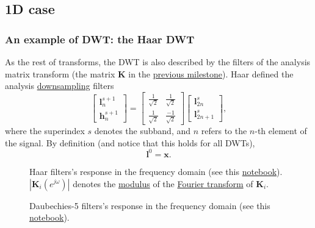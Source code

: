 \subsection{1D case}

\subsubsection{An example of DWT: the Haar DWT}
As the rest of transforms, the DWT is also described by the filters of
the analysis matrix transform (the matrix ${\mathbf K}$ in the
\href{https://sistemas-multimedia.github.io/study_guide/06-color_transform/}{previous
  milestone}). Haar defined the analysis
\href{https://en.wikipedia.org/wiki/Downsampling_(signal_processing)}{downsampling}
filters
\begin{equation}
  \begin{bmatrix}
    {\mathbf l}^{s+1}_n \\
    {\mathbf h}^{s+1}_n
  \end{bmatrix}
  = 
  \begin{bmatrix} \frac{1}{\sqrt{2}} & \frac{1}{\sqrt{2}} \\ \frac{1}{\sqrt{2}} & \frac{-1}{\sqrt{2}} \end{bmatrix}
  \begin{bmatrix}
    {\mathbf l}^s_{2n} \\
    {\mathbf l}^s_{2n+1}
  \end{bmatrix},
  \label{eq:Haar_transform}
\end{equation}
where the superindex $s$ denotes the subband, and $n$ refers to the
$n$-th element of the signal. By definition (and notice that this
holds for all DWTs),
\begin{equation}
  {\mathbf l}^0={\mathbf x}.
\end{equation}

\begin{figure}
  \centering
  \caption{Haar filters's response in the frequency domain (see this
    \href{https://github.com/Sistemas-Multimedia/Sistemas-Multimedia.github.io/blob/master/study_guide/05-DWT/dwt_filters_analysis.ipynb}{notebook}).
    $|{\mathbf K}_i(e^{j\omega})|$ denotes the
    \href{https://en.wikipedia.org/wiki/Absolute_value}{modulus} of
    the \href{https://en.wikipedia.org/wiki/Fourier_transform}{Fourier
      transform} of ${\mathbf K}_i$.}
  \label{fig:Haar_modulus}
\end{figure}

\begin{figure}
  \centering
  \caption{Daubechies-5 filters's response in the frequency domain
    (see this
    \href{https://github.com/Sistemas-Multimedia/Sistemas-Multimedia.github.io/blob/master/study_guide/05-DWT/dwt_filters_analysis.ipynb}{notebook}).}
  \label{fig:db5_modulus}
\end{figure}

